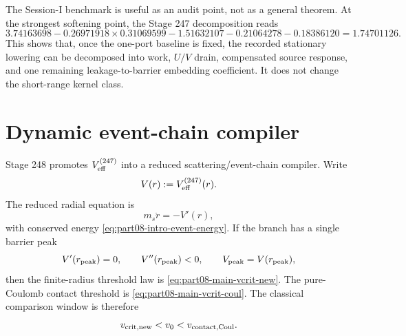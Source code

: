 The Session-I benchmark is useful as an audit point, not as a general theorem.  At the strongest softening point, the Stage 247 decomposition reads
\begin{equation}
\label{eq:part08-stage247-benchmark-decomposition}
3.74163698
-
0.26971918\times0.31069599
-
1.51632107
-
0.21064278
-
0.18386120
=
1.74701126.
\end{equation}
This shows that, once the one-port baseline is fixed, the recorded stationary lowering can be decomposed into work, \(U/V\) drain, compensated source response, and one remaining leakage-to-barrier embedding coefficient.  It does not change the short-range kernel class.

\section{Dynamic event-chain compiler}
\label{sec:part08_relaxed_branch:dynamic-event-chain-compiler}

Stage 248 promotes \(V_{\rm eff}^{(247)}\) into a reduced scattering/event-chain compiler.  Write
\begin{equation}
\label{eq:part08-stage248-vdef}
V(r):=V_{\rm eff}^{(247)}(r).
\end{equation}
The reduced radial equation is
\begin{equation}
\label{eq:part08-stage248-radial-eom}
m_s\ddot r=-V'(r),
\end{equation}
with conserved energy \cref{eq:part08-intro-event-energy}.  If the branch has a single barrier peak
\begin{equation}
\label{eq:part08-stage248-peak}
V'(r_{\rm peak})=0,
\qquad
V''(r_{\rm peak})<0,
\qquad
V_{\rm peak}=V(r_{\rm peak}),
\end{equation}
then the finite-radius threshold law is \cref{eq:part08-main-vcrit-new}.  The pure-Coulomb contact threshold is \cref{eq:part08-main-vcrit-coul}.  The classical comparison window is therefore
\begin{equation}
\label{eq:part08-stage248-classical-window}
v_{\rm crit,new}<v_0<v_{\rm contact,Coul}.
\end{equation}

